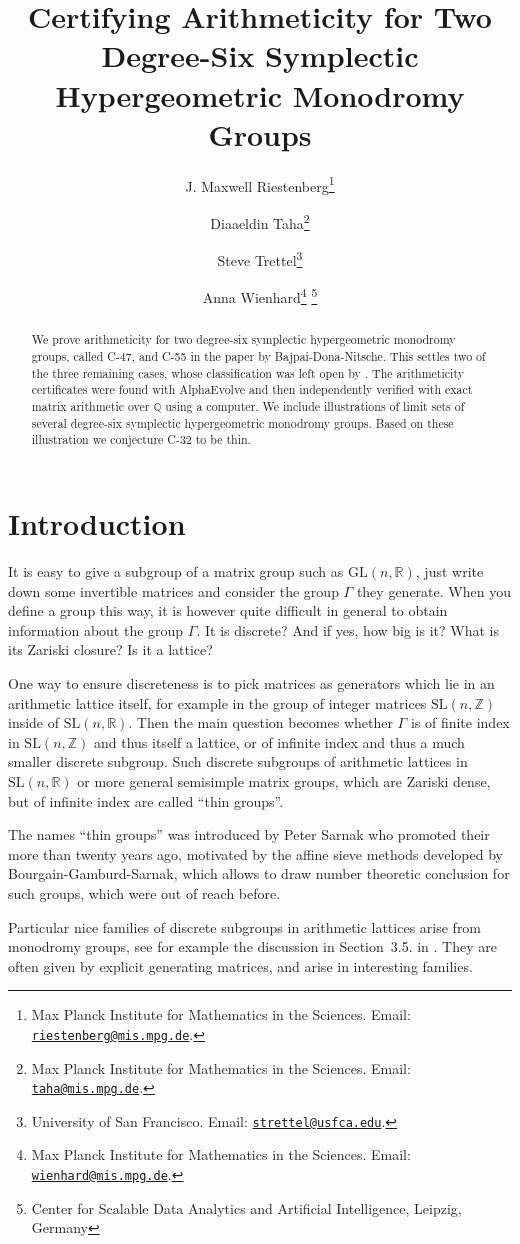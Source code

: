 \documentclass[11pt]{article}
\title{Certifying Arithmeticity for Two Degree-Six Symplectic Hypergeometric Monodromy Groups}
\author{
  J. Maxwell Riestenberg\thanks{Max Planck Institute for Mathematics in the Sciences. Email:
		\href{mailto:riestenberg@mis.mpg.de} {\nolinkurl {riestenberg@mis.mpg.de}}.}
\and
  Diaaeldin Taha\thanks{Max Planck Institute for Mathematics in the Sciences. Email:
		\href{mailto:taha@mis.mpg.de} {\nolinkurl {taha@mis.mpg.de}}.} 
\and
  Steve Trettel\thanks{University of San Francisco. Email:
		\href{mailto:strettel@usfca.edu} {\nolinkurl {strettel@usfca.edu}}.} 
\and
  Anna Wienhard\thanks{Max Planck Institute for Mathematics in the Sciences. Email:
		\href{mailto:wienhard@mis.mpg.de} {\nolinkurl {wienhard@mis.mpg.de}}.} 
        \thanks{Center for Scalable Data Analytics and Artificial Intelligence, Leipzig, Germany}
}
\date{}
\newcommand{\QQ}{\mathbb{Q}}
\begin{document}
\maketitle

\begin{abstract}
We prove arithmeticity for two degree-six symplectic hypergeometric monodromy groups, called C-47, and C-55 in the paper  \cite{BajpaiDonaNitsche2025Thin} by Bajpai-Dona-Nitsche. This settles two of the three remaining cases, whose classification was left open by \cite{BajpaiDonaNitsche2025Thin}. The arithmeticity certificates were found with AlphaEvolve and then independently verified with exact matrix arithmetic over $\QQ$ using a computer.
We include illustrations of limit sets of several degree-six symplectic hypergeometric monodromy groups. Based on these illustration we conjecture C-32 to be thin. 
\end{abstract}

\section{Introduction}
It is easy to give a subgroup of a matrix group such as $\mathrm{GL}(n,\mathbb{R})$, just write down some invertible matrices and consider the group $\Gamma$ they generate. When you define a group this way, it is however quite difficult in general to obtain information about the group $\Gamma$. It is discrete? And if yes, how big is it? What is its Zariski closure? Is it a lattice? 

One way to ensure discreteness is to pick matrices as generators which lie in an arithmetic lattice itself, for example in the group of integer matrices $\mathrm{SL}(n,\mathbb{Z})$ inside of $\mathrm{SL}(n,\mathbb{R})$. Then the main question becomes whether $\Gamma$ is of finite index in $\mathrm{SL}(n,\mathbb{Z})$ and thus itself a lattice, or of infinite index and thus a much smaller discrete subgroup. 
Such discrete subgroups of arithmetic lattices in $\mathrm{SL}(n,\mathbb{R})$ or more general semisimple matrix groups, which are Zariski dense, but of infinite index are called ``thin groups''. 

The names ``thin groups'' was introduced by Peter Sarnak who promoted their more than twenty years ago, motivated by the affine sieve methods developed by Bourgain-Gamburd-Sarnak, which allows to draw number theoretic conclusion for such groups, which were out of reach before. 

Particular nice families of discrete subgroups in arithmetic lattices arise from monodromy groups, see for example the discussion in Section~3.5. in \cite{Sarnak2014NotesThin}. They are often given by explicit generating matrices, and arise in interesting families. 
\end{document}
